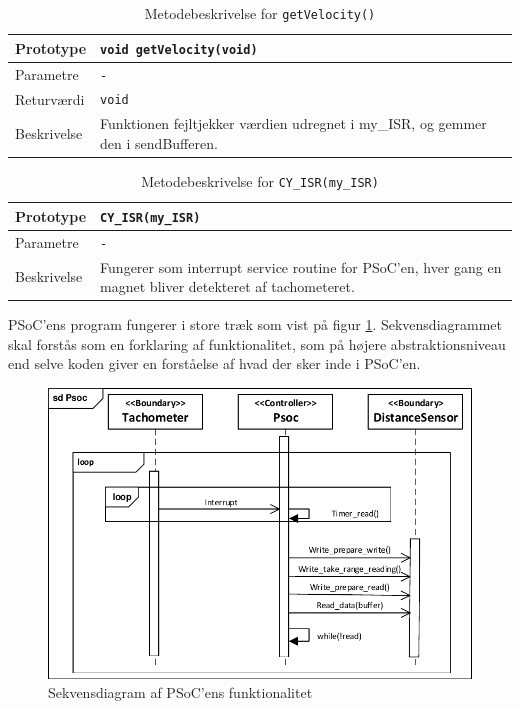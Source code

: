 \clearpage

\begin{table}[h]
\begin{tabularx}{\textwidth}{| L{2.5 cm} | Z |} \hline
Prototype 	& \texttt{void getVelocity(void)} \\\hline
Parametre 	& \texttt{-}		\\\hline
Returværdi	& \texttt{void} 			\newline \\\hline
Beskrivelse	& Funktionen fejltjekker værdien udregnet i my\_ISR, og gemmer den i sendBufferen. \newline \\\hline
\end{tabularx}
\caption{Metodebeskrivelse for \texttt{getVelocity()}}
\label{table:psoc_getvelocity}
\end{table}

\begin{table}[h]
\begin{tabularx}{\textwidth}{| L{2.5 cm} | Z |} \hline
Prototype 	& \texttt{CY\_ISR(my\_ISR)} 	\\\hline
Parametre 	& \texttt{-}				\\\hline
Beskrivelse	& Fungerer som interrupt service routine for PSoC'en, hver gang en magnet bliver detekteret af tachometeret.\newline \\\hline
\end{tabularx}
\caption{Metodebeskrivelse for \texttt{CY\_ISR(my\_ISR)}}
\label{table:psoc_my_isr}
\end{table}

PSoC'ens program fungerer i store træk som vist på figur \ref{fig:sd_main_psoc}. Sekvensdiagrammet skal forstås som en forklaring af funktionalitet, som på højere abstraktionsniveau end selve koden giver en forståelse af hvad der sker inde i PSoC'en. 

\begin{figure}[h]
\centering
\includegraphics[]{../fig/diagrammer/psoc/sd_psoc.pdf}
\caption{Sekvensdiagram af PSoC'ens funktionalitet}
\label{fig:sd_main_psoc}
\end{figure}

\clearpage

